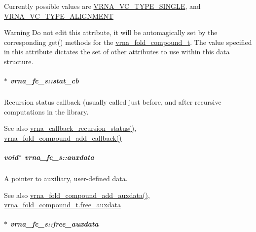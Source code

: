 Currently possible values are \hyperlink{group__fold__compound_gga01a4ff86fa71deaaa5d1abbd95a1447da1608d3aa78905fc39e0d25a624ac9512}{V\+R\+N\+A\+\_\+\+V\+C\+\_\+\+T\+Y\+P\+E\+\_\+\+S\+I\+N\+G\+LE}, and \hyperlink{group__fold__compound_gga01a4ff86fa71deaaa5d1abbd95a1447da056345f1bcfe7cd595d1fd437c05246d}{V\+R\+N\+A\+\_\+\+V\+C\+\_\+\+T\+Y\+P\+E\+\_\+\+A\+L\+I\+G\+N\+M\+E\+NT} \begin{DoxyWarning}{Warning}
Do not edit this attribute, it will be automagically set by the corresponding get() methods for the \hyperlink{group__fold__compound_ga1b0cef17fd40466cef5968eaeeff6166}{vrna\+\_\+fold\+\_\+compound\+\_\+t}. The value specified in this attribute dictates the set of other attributes to use within this data structure. 
\end{DoxyWarning}
\subparagraph[{\texorpdfstring{stat\+\_\+cb}{stat_cb}}]{$\ast$ vrna\+\_\+fc\+\_\+s\+::stat\+\_\+cb}\hypertarget{group__fold__compound_a87a83f6795b569000efcbe65acc3dd81}{}\label{group__fold__compound_a87a83f6795b569000efcbe65acc3dd81}


Recursion status callback (usually called just before, and after recursive computations in the library. 

\begin{DoxySeeAlso}{See also}
\hyperlink{group__fold__compound_ga4a4a0d838de6d18315bafc84f93f5cc0}{vrna\+\_\+callback\+\_\+recursion\+\_\+status()}, \hyperlink{group__fold__compound_ga097ed6133055624667cbce8cfdebf82d}{vrna\+\_\+fold\+\_\+compound\+\_\+add\+\_\+callback()} 
\end{DoxySeeAlso}
\subparagraph[{\texorpdfstring{auxdata}{auxdata}}]{\setlength{\rightskip}{0pt plus 5cm}void$\ast$ vrna\+\_\+fc\+\_\+s\+::auxdata}\hypertarget{group__fold__compound_a20048e0c369e9f24b55423d600037c68}{}\label{group__fold__compound_a20048e0c369e9f24b55423d600037c68}


A pointer to auxiliary, user-\/defined data. 

\begin{DoxySeeAlso}{See also}
\hyperlink{group__fold__compound_ga6316a9426bea2f742375e8df6febd3f6}{vrna\+\_\+fold\+\_\+compound\+\_\+add\+\_\+auxdata()}, \hyperlink{group__fold__compound_a8e84dbabab016ecd74da6c38cb94e816}{vrna\+\_\+fold\+\_\+compound\+\_\+t.\+free\+\_\+auxdata} 
\end{DoxySeeAlso}
\subparagraph[{\texorpdfstring{free\+\_\+auxdata}{free_auxdata}}]{$\ast$ vrna\+\_\+fc\+\_\+s\+::free\+\_\+auxdata}\hypertarget{group__fold__compound_a8e84dbabab016ecd74da6c38cb94e816}{}\label{group__fold__compound_a8e84dbabab016ecd74da6c38cb94e816}


